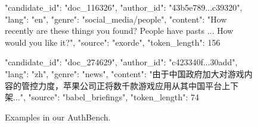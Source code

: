 \documentclass{article}
\begin{document}


\begin{figure}[h!]
\centering

\begin{jsonexample}{}
\begin{JSONVerbatim}
{
  "candidate_id": "doc_116326",
  "author_id": "43b5e789...c39320",
  "lang": "en",
  "genre": "social_media/people",
  "content": "How recently are these things you found? People have pasts ... How would you like it?",
  "source": "exorde",
  "token_length": 156
}
\end{JSONVerbatim}
\end{jsonexample}

\vspace{6pt}

\begin{jsonexample}{}
\begin{JSONVerbatim}
{
  "candidate_id": "doc_274629",
  "author_id": "c423340f...30add",
  "lang": "zh",
  "genre": "news",
  "content": "由于中国政府加大对游戏内容的管控力度，苹果公司正将数千款游戏应用从其中国平台上下架...",
  "source": "babel_briefings",
  "token_length": 74
}
\end{JSONVerbatim}
\end{jsonexample}

\caption{Examples in our AuthBench.}
\label{fig:json-examples}
\end{figure}
\end{document}
